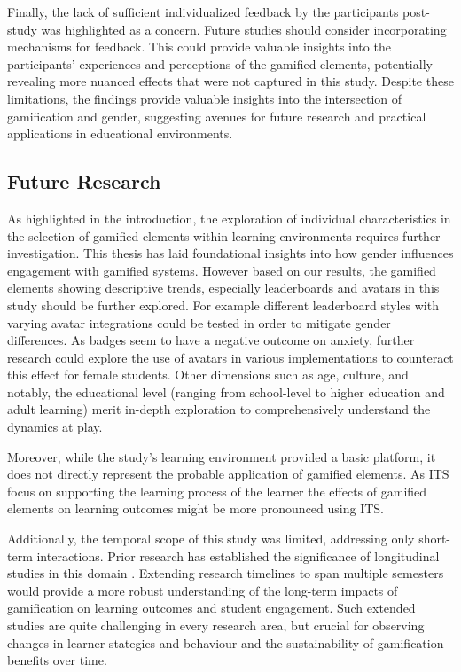 Finally, the lack of sufficient individualized feedback by the participants post-study was highlighted as a concern. Future studies should consider incorporating mechanisms for feedback. This could provide valuable insights into the participants' experiences and perceptions of the gamified elements, potentially revealing more nuanced effects that were not captured in this study.
Despite these limitations, the findings provide valuable insights into the intersection of gamification and gender, suggesting avenues for future research and practical applications in educational environments.

\subsection{Future Research}
As highlighted in the introduction, the exploration of individual characteristics in the selection of gamified elements within learning environments requires further investigation.
This thesis has laid foundational insights into how gender influences engagement with gamified systems. 
However based on our results, the gamified elements showing descriptive trends, especially leaderboards and avatars in this study should be further explored.
For example different leaderboard styles with varying avatar integrations could be tested in order to mitigate gender differences.
As badges seem to have a negative outcome on anxiety, further research could explore the use of avatars in various implementations to counteract this effect for female students.
Other dimensions such as age, culture, and notably, the educational level (ranging from school-level to higher education and adult learning) merit in-depth exploration to comprehensively understand the dynamics at play.

Moreover, while the study's learning environment provided a basic platform, it does not directly represent the probable application of gamified elements. As ITS focus on supporting the learning process of the learner the effects of gamified elements on learning outcomes might be more pronounced using ITS.

Additionally, the temporal scope of this study was limited, addressing only short-term interactions. Prior research has established the significance of longitudinal studies in this domain \parencite{oliveiraTailoredGamificationEducation2023,dehghanzadehUsingGamificationSupport2024}. Extending research timelines to span multiple semesters would provide a more robust understanding of the long-term impacts of gamification on learning outcomes and student engagement. Such extended studies are quite challenging in every research area, but crucial for observing changes in learner stategies and behaviour and the sustainability of gamification benefits over time.

